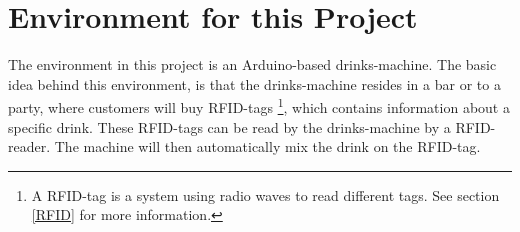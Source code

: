 \section{Environment for this Project}
The environment in this project is an Arduino-based drinks-machine. The basic idea behind this environment, is that the drinks-machine resides in a bar or to a party, where customers will buy RFID-tags \footnote{A RFID-tag is a system using radio waves to read different tags. See section \ref{RFID} for more information.}, which contains information about a specific drink. These RFID-tags can be read by the drinks-machine by a RFID-reader. The machine will then automatically mix the drink on the RFID-tag.

